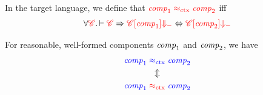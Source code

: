 \documentclass[a4paper]{article}
\begin{document}
\begin{definition}
  In the target language, we define that ${\color{red} \mathit{comp}_1 \mathrel{{\color{red} \approx_{\mathrm{ctx}}}} \mathit{comp}_2}$ iff
  \begin{equation*}
    \forall {\color{red} \mathscr{C}} \ldotp \vdash {\color{red} \mathscr{C}} \Rightarrow {\color{red} \mathscr{C}[\mathit{comp}_1] {\Downarrow_{-}}} \Leftrightarrow {\color{red} \mathscr{C}[\mathit{comp}_2] {\Downarrow_{-}}}
  \end{equation*}
\end{definition}

\begin{theorem}
  \label{thm:full-abstraction}
  For reasonable, well-formed components $\mathit{comp}_1$ and $\mathit{comp}_2$, we have
  \begin{gather*}
    {\color{blue}\mathit{comp}_1} \mathrel{{\color{blue} \approx_{\mathrm{ctx}}}} {\color{blue} \mathit{comp}_2}\\
    \Updownarrow\\
    {\color{blue} \mathit{comp}_1} \mathrel{{\color{red} \approx_{\mathrm{ctx}}}} {\color{blue} \mathit{comp}_2}
  \end{gather*}
\end{theorem}
\end{document}
